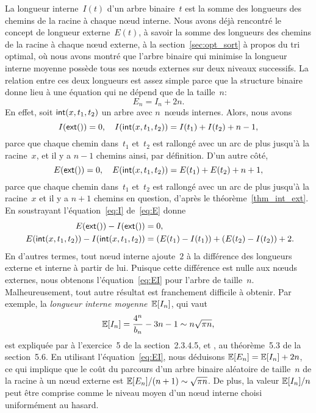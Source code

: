 La longueur interne~\(I(t)\)
d'un arbre binaire~\(t\) est la somme des longueurs des chemins de la
racine à chaque nœud interne. Nous avons déjà rencontré le concept
de longueur externe~\(E(t)\), à
savoir la somme des longueurs des chemins de la racine à chaque
nœud externe, à la section~\vref{sec:opt_sort} à propos du tri
optimal, où nous avons montré que l'arbre binaire qui minimise la
longueur interne moyenne possède tous ses nœuds externes sur deux
niveaux successifs. La relation entre ces deux longueurs est assez
simple parce que la structure binaire donne lieu à une équation qui ne
dépend que de la taille~\(n\):
\begin{equation}
E_n = I_n + 2n.\label{eq:EI}
\end{equation}
En effet, soit \(\textsf{int}(x,t_1,t_2)\) un arbre avec \(n\)~nœuds
internes. Alors, nous avons
\begin{equation}
  I(\textsf{ext}()) = 0,\quad
  I(\textsf{int}(x,t_1,t_2)) = I(t_1) + I(t_2) + n - 1,
\label{eq:I}
\end{equation}
parce que chaque chemin dans~\(t_1\) et~\(t_2\) est rallongé avec un
arc de plus jusqu'à la racine~\(x\), et il y a \(n-1\) chemins ainsi,
par définition. D'un autre côté,
\begin{equation}
  E(\textsf{ext}()) = 0,\quad
  E(\textsf{int}(x,t_1,t_2)) = E(t_1) + E(t_2) + n + 1,
\label{eq:E}
\end{equation}
parce que chaque chemin dans~\(t_1\) et~\(t_2\) est rallongé avec un
arc de plus jusqu'à la racine~\(x\) et il y a \(n+1\) chemins en
question, d'après le théorème~\vref{thm_int_ext}. En soustrayant
l'équation~\eqref{eq:I} de~\eqref{eq:E} donne
\begin{align*}
  E(\textsf{ext}()) - I(\textsf{ext}()) &= 0,\\
  E(\textsf{int}(x,t_1,t_2)) - I(\textsf{int}(x,t_1,t_2))
  &= (E(t_1) - I(t_1)) + (E(t_2) - I(t_2)) + 2.\!\!
\end{align*}
En d'autres termes, tout nœud interne ajoute~\(2\) à la différence
des longueurs externe et interne à partir de lui. Puisque cette
différence est nulle aux nœuds externes, nous obtenons
l'équation~\eqref{eq:EI} pour l'arbre de taille~\(n\). Malheureusement,
tout autre résultat est franchement difficile à obtenir. Par exemple,
la \emph{longueur interne moyenne}~\(\mathbb{E}[{I_n}]\), qui vaut
\begin{equation*}
\mathbb{E}[{I_n}]  = \frac{4^n}{b_n} - 3n - 1 \sim n \sqrt{\pi n},
\end{equation*}
est expliquée par \cite{Knuth_1997} à l'exercice~5 de la
section~2.3.4.5, et \cite{SedgewickFlajolet_1996}, au théorème~5.3 de
la section~5.6.  En utilisant l'équation~\eqref{eq:EI}, nous déduisons
\(\mathbb{E}[{E_n}] = \mathbb{E}[{I_n}] + 2n\), ce qui implique que le coût
du parcours d'un arbre binaire aléatoire de taille~\(n\) de la racine
à un nœud externe est \(\mathbb{E}[{E_n}]/(n+1) \sim \sqrt{\pi
  n}\). De plus, la valeur \(\mathbb{E}[{I_n}]/n\) peut être comprise
comme le niveau moyen d'un nœud interne choisi uniformément au hasard.

